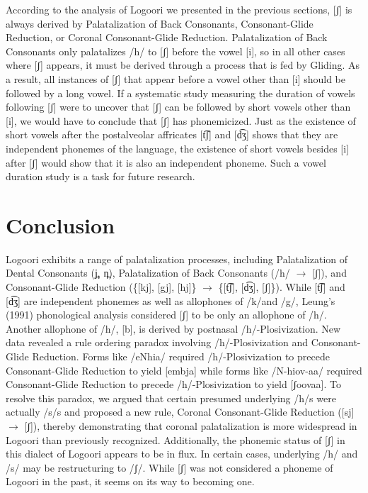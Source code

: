 \documentclass[output=paper]{langsci/langscibook}
\begin{document}
According to the analysis of Logoori we presented in the previous sections, [ʃ] is always derived by Palatalization of Back Consonants, Consonant-Glide Reduction, or Coronal Consonant-Glide Reduction. Palatalization of Back Consonants only palatalizes /h/ to [ʃ] before the vowel [i], so in all other cases where [ʃ] appears, it must be derived through a process that is fed by Gliding. As a result, all instances of [ʃ] that appear before a vowel other than [i] should be followed by a long vowel. If a systematic study measuring the duration of vowels following [ʃ] were to uncover that [ʃ] can be followed by short vowels other than [i], we would have to conclude that [ʃ] has phonemicized. Just as the existence of short vowels after the postalveolar affricates [t͡ʃ] and [d͡ʒ] shows that they are independent phonemes of the language, the existence of short vowels besides [i] after [ʃ] would show that it is also an independent phoneme. Such a vowel duration study is a task for future research.

\section{Conclusion}

Logoori exhibits a range of palatalization processes, including Palatalization of Dental Consonants (j̪, n̪), Palatalization of Back Consonants (/h/ $\rightarrow$ [ʃ]), and Consonant-Glide Reduction (\{[kj], [gj], [hj]\} $\rightarrow$ \{[t͡ʃ], [d͡ʒ], [ʃ]\}). While [t͡ʃ] and [d͡ʒ] are independent phonemes as well as allophones of /k/and /g/, Leung’s (1991) phonological analysis considered [ʃ] to be only an allophone of /h/. Another allophone of /h/, [b], is derived by postnasal /h/-Plosivization. New data revealed a rule ordering paradox involving /h/-Plosivization and Consonant-Glide Reduction. Forms like /eNhia/ required /h/-Plosivization to precede Consonant-Glide Reduction to yield [embja] while forms like /N-hiov-aa/ required Consonant-Glide Reduction to precede /h/-Plosivization to yield [ʃoovaa]. To resolve this paradox, we argued that certain presumed underlying /h/s were actually /s/s and proposed a new rule, Coronal Consonant-Glide Reduction ([sj] $\rightarrow$ [ʃ]), thereby demonstrating that coronal palatalization is more widespread in Logoori than previously recognized. Additionally, the phonemic status of [ʃ] in this dialect of Logoori appears to be in flux. In certain cases, underlying /h/ and /s/ may be restructuring to /ʃ/. While [ʃ] was not considered a phoneme of Logoori in the past, it seems on its way to becoming one.
\end{document}
